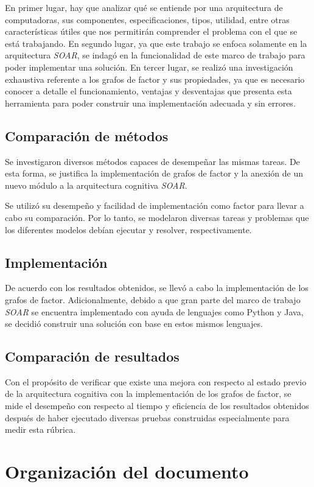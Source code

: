  En primer lugar, hay que analizar qu\'{e} se entiende por una arquitectura de computadoras, sus componentes, especificaciones, tipos, utilidad, entre otras caracter\'{i}sticas \'{u}tiles que nos permitir\'{a}n comprender el problema con el que se est\'{a} trabajando. En segundo lugar, ya que este trabajo se enfoca solamente en la arquitectura \emph{SOAR}, se indag\'{o} en la funcionalidad de este marco de trabajo para poder implementar una soluci\'{o}n. En tercer lugar, se realiz\'{o} una investigaci\'{o}n exhaustiva referente a los grafos de factor y sus propiedades, ya que es necesario conocer a detalle el funcionamiento, ventajas y desventajas que presenta esta herramienta para poder construir una implementaci\'{o}n adecuada y sin errores.
 
 \subsection{Comparaci\'{o}n de m\'{e}todos}
 
 Se investigaron diversos m\'{e}todos capaces de desempe\~nar las mismas tareas. De esta forma, se justifica la implementaci\'{o}n de grafos de factor y la anexi\'{o}n de un nuevo m\'{o}dulo a la arquitectura cognitiva \emph{SOAR}.
 
 Se utiliz\'{o} su desempe\~no y facilidad de implementaci\'{o}n como factor para llevar a cabo su comparaci\'{o}n. Por lo tanto, se modelaron diversas tareas y problemas que los diferentes modelos deb\'{i}an ejecutar y resolver, respectivamente.
 
 \subsection{Implementaci\'{o}n}
 
 De acuerdo con los resultados obtenidos, se llev\'{o} a cabo la implementaci\'{o}n de los grafos de factor. Adicionalmente, debido a que gran parte del marco de trabajo \emph{SOAR} se encuentra implementado con ayuda de lenguajes como Python y Java, se decidi\'{o} construir una soluci\'{o}n con base en estos mismos lenguajes. 
 
 \subsection{Comparaci\'{o}n de resultados}
 
 Con el prop\'{o}sito de verificar que existe una mejora con respecto al estado previo de la arquitectura cognitiva con la implementaci\'{o}n de los grafos de factor, se mide el desempe\~no con respecto al tiempo y eficiencia de los resultados obtenidos despu\'{e}s de haber ejecutado diversas pruebas construidas especialmente para medir esta r\'{u}brica.
 
  \section{Organizaci\'{o}n del documento}
  
  
 
  